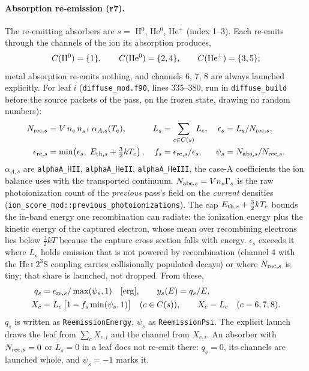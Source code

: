 \documentclass[english,a4paper]{my_memo}
\newcommand{\code}[1]{\texttt{#1}}
\begin{document}
\paragraph{Absorption re-emission (r7).}  The re-emitting absorbers are
$s = $ H$^0$, He$^0$, He$^+$ (index 1--3).  Each re-emits through the channels
of the ion its absorption produces,
\begin{equation}
 C({\rm H^0})=\{1\},\qquad C({\rm He^0})=\{2,4\},\qquad C({\rm He^+})=\{3,5\};
\end{equation}
metal absorption re-emits nothing, and channels 6, 7, 8 are always launched
explicitly.  For leaf $i$ (\code{diffuse\_mod.f90}, lines 335--380, run in
\code{diffuse\_build} before the source packets of the pass, on the frozen
state, drawing no random numbers):
\begin{align}
 N_{{\rm rec},s} &= V\,n_e\,n_{s^+}\,\alpha_{A,s}(T_e), &
 L_s &= \sum_{c\in C(s)} L_c, &
 \epsilon_s &= L_s/N_{{\rm rec},s}, \label{eq:reem-nrec}\\
 \epsilon_{{\rm re},s} &= \min\!\left(\epsilon_s,\;E_{{\rm th},s}+\tfrac32kT_e\right), &
 f_s &= \epsilon_{{\rm re},s}/\epsilon_s, &
 \psi_s &= N_{{\rm abs},s}/N_{{\rm rec},s}. \label{eq:reem-psi}
\end{align}
$\alpha_{A,s}$ are \code{alphaA\_HII}, \code{alphaA\_HeII},
\code{alphaA\_HeIII}, the case-A coefficients the ion balance uses with the
transported continuum.  $N_{{\rm abs},s}=V n_s\Gamma_s$ is the raw
photoionization count of the \emph{previous} pass's field on the
\emph{current} densities (\code{ion\_score\_mod::previous\_photoionizations}).
The cap $E_{{\rm th},s}+\frac32 kT_e$ bounds the in-band energy one
recombination can radiate: the ionization energy plus the kinetic energy of
the captured electron, whose mean over recombining electrons lies below
$\frac32kT$ because the capture cross section falls with energy.
$\epsilon_s$ exceeds it where $L_s$ holds emission that is not powered by
recombination (channel 4 with the He\,\textsc{i} $2^3$S coupling carries
collisionally populated decays) or where $N_{{\rm rec},s}$ is tiny; that share
is launched, not dropped.  From these,
\begin{align}
 q_s &= \epsilon_{{\rm re},s}/\max(\psi_s,1)\quad[\mathrm{erg}],
 \qquad y_s(E) = q_s/E, \label{eq:reem-yield}\\
 X_c &= L_c\,\bigl[1-f_s\min(\psi_s,1)\bigr]\quad (c\in C(s)),\qquad
 X_c = L_c\quad(c=6,7,8). \label{eq:reem-explicit}
\end{align}
$q_s$ is written as \code{ReemissionEnergy}, $\psi_s$ as \code{ReemissionPsi}.
The explicit launch draws the leaf from $\sum_c X_{c,i}$ and the channel from
$X_{c,i}$.  An absorber with $N_{{\rm rec},s}=0$ or $L_s=0$ in a leaf does
not re-emit there: $q_s = 0$, its channels are launched whole, and
$\psi_s=-1$ marks it.
\end{document}
